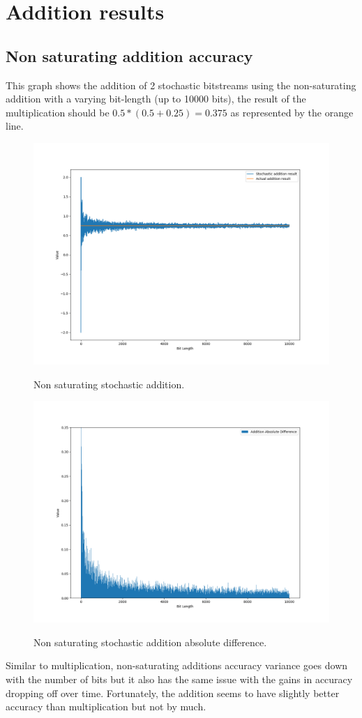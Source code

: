\documentclass[a4paper,oneside,phd,etd]{BYUPhys}
\begin{document}
\section{Addition results}
\subsection{Non saturating addition accuracy}
This graph shows the addition of 2 stochastic bitstreams using the non-saturating addition with a varying bit-length (up to 10000 bits), the result of the multiplication should be $0.5*(0.5+0.25)=0.375$ as represented by the orange line.

\begin{figure}[H]
\centering
\includegraphics[scale=0.4]{results/add-bi.png}
\label{fig:no_sat}
\caption{Non saturating stochastic addition.}
\end{figure}
\begin{figure}[H]
\centering
\includegraphics[scale=0.4]{results/add-bi-abs.png}
\label{fig:abs_no_sat}
\caption{Non saturating stochastic addition absolute difference.}
\end{figure}
Similar to multiplication, non-saturating additions accuracy variance goes down with the number of bits but it also has the same issue with the gains in accuracy dropping off over time. Fortunately, the addition seems to have slightly better accuracy than multiplication but not by much.
\end{document}
